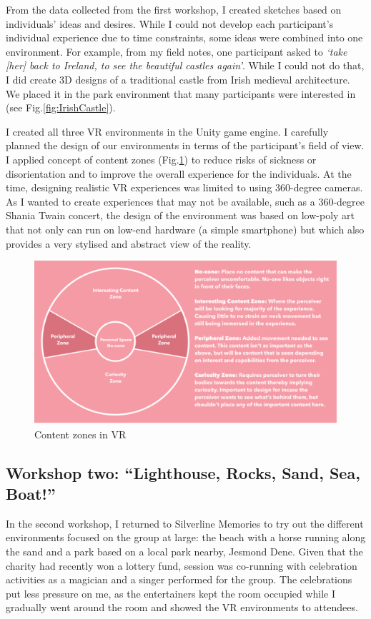 From the data collected from the first workshop, I created sketches based on individuals' ideas and desires. While I could not develop each participant's individual experience due to time constraints, some ideas were combined into one environment. For example, from my field notes, one participant asked to \textit{`take [her] back to Ireland, to see the beautiful castles again’}. While I could not do that, I did create 3D designs of a traditional castle from Irish medieval architecture. We placed it in the park environment that many participants were interested in (see Fig.\ref{fig:IrishCastle}).

I created all three VR environments in the Unity game engine. I carefully planned the design of our environments in terms of the participant's field of view. I applied \cite{alger_visual_2015} concept of content zones (Fig.\ref{fig:ContentZone}) to reduce risks of sickness or disorientation and to improve the overall experience for the individuals. At the time, designing realistic VR experiences was limited to using 360-degree cameras. As I wanted to create experiences that may not be available, such as a 360-degree Shania Twain concert, the design of the environment was based on low-poly art that not only can run on low-end hardware (a simple smartphone) but which also provides a very stylised and abstract view of the reality.

\begin{figure}[htp]
\centering
\includegraphics[width=.8\linewidth]{Images/ChapterFour/ContentZones.png}
\caption{Content zones in VR}
\label{fig:ContentZone}
\end{figure}

\subsection{Workshop two: ``Lighthouse, Rocks, Sand, Sea, Boat!''}
\label{StudyOne:WorkshopTwo}
In the second workshop, I returned to Silverline Memories to try out the different environments focused on the group at large: the beach with a horse running along the sand and a park based on a local park nearby, Jesmond Dene. Given that the charity had recently won a lottery fund, session was co-running with celebration activities as a magician and a singer performed for the group. The celebrations put less pressure on me, as the entertainers kept the room occupied while I gradually went around the room and showed the VR environments to attendees. 


